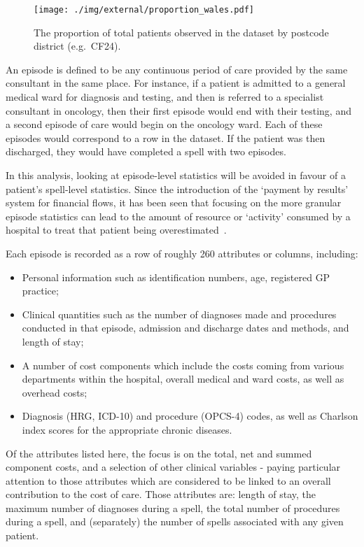 \begin{figure}[htbp]
    \centering
    \texttt{[image: ./img/external/proportion\_wales.pdf]}
    \caption{The proportion of total patients observed in the dataset by
    postcode district (e.g.\ CF24).}\label{fig:proportion_wales}
\end{figure}

An episode is defined to be any continuous period of care provided
by the same consultant in the same place. For instance, if a patient is admitted
to a general medical ward for diagnosis and testing, and then is referred to a
specialist consultant in oncology, then their first episode would end with their
testing, and a second episode of care would begin on the oncology ward. Each of
these episodes would correspond to a row in the dataset. If the patient was then
discharged, they would have completed a spell with two episodes.

In this analysis, looking at episode-level statistics will be avoided in favour
of a patient's spell-level statistics. Since the introduction of the `payment by
results' system for financial flows, it has been seen that focusing on the more
granular episode statistics can lead to the amount of resource or `activity'
consumed by a hospital to treat that patient being
overestimated~\cite{Aylin2004}.

Each episode is recorded as a row of roughly 260 attributes or columns,
including:

\begin{itemize}
    \item Personal information such as identification numbers, age, registered
        GP practice;
    \item Clinical quantities such as the number of diagnoses made and
        procedures conducted in that episode, admission and discharge dates and
        methods, and length of stay;
    \item A number of cost components which include the costs coming from
        various departments within the hospital, overall medical and ward costs,
        as well as overhead costs;
    \item Diagnosis (HRG, ICD-10) and procedure (OPCS-4) codes, as well as
        Charlson index scores for the appropriate chronic diseases.
\end{itemize}

Of the attributes listed here, the focus is on the total, net and summed
component costs, and a selection of other clinical variables \-- paying
particular attention to those attributes which are considered to be linked to an
overall contribution to the cost of care. Those attributes are: length of stay,
the maximum number of diagnoses during a spell, the total number of procedures
during a spell, and (separately) the number of spells associated with any given
patient.

